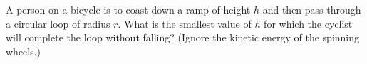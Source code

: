 A person on a bicycle is to coast down a ramp of height
$h$ and then pass through a circular loop of radius $r$.
What is the smallest value of $h$ for which the cyclist will
complete the loop without falling? (Ignore the kinetic
energy of the spinning wheels.)\answercheck\hwendpart
